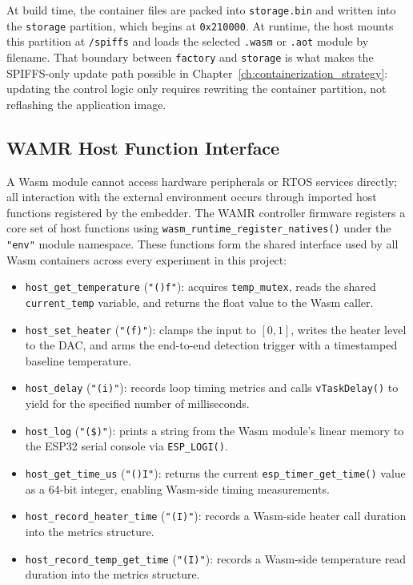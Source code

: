 \documentclass[12pt, a4paper]{report}
\begin{document}
At build time, the container files are packed into \texttt{storage.bin} and written into the \texttt{storage} partition, which begins at \texttt{0x210000}. At runtime, the host mounts this partition at \texttt{/spiffs} and loads the selected \texttt{.wasm} or \texttt{.aot} module by filename. That boundary between \texttt{factory} and \texttt{storage} is what makes the SPIFFS-only update path possible in Chapter~\ref{ch:containerization_strategy}: updating the control logic only requires rewriting the container partition, not reflashing the application image.

\subsection{WAMR Host Function Interface}
\label{subsec:host-functions-design}

A Wasm module cannot access hardware peripherals or RTOS services directly; all interaction with the external environment occurs through imported host functions registered by the embedder. The WAMR controller firmware registers a core set of host functions using \texttt{wasm\_runtime\_register\_natives()} under the \texttt{"env"} module namespace. These functions form the shared interface used by all Wasm containers across every experiment in this project:

\begin{itemize}
    \item \texttt{host\_get\_temperature} (\texttt{"()f"}): acquires \texttt{temp\_mutex}, reads the shared \texttt{current\_temp} variable, and returns the float value to the Wasm caller.
    \item \texttt{host\_set\_heater} (\texttt{"(f)"}): clamps the input to $[0, 1]$, writes the heater level to the DAC, and arms the end-to-end detection trigger with a timestamped baseline temperature.
    \item \texttt{host\_delay} (\texttt{"(i)"}): records loop timing metrics and calls \texttt{vTaskDelay()} to yield for the specified number of milliseconds.
    \item \texttt{host\_log} (\texttt{"(\$)"}): prints a string from the Wasm module's linear memory to the ESP32 serial console via \texttt{ESP\_LOGI()}.
    \item \texttt{host\_get\_time\_us} (\texttt{"()I"}): returns the current \texttt{esp\_timer\_get\_time()} value as a 64-bit integer, enabling Wasm-side timing measurements.
    \item \texttt{host\_record\_heater\_time} (\texttt{"(I)"}): records a Wasm-side heater call duration into the metrics structure.
    \item \texttt{host\_record\_temp\_get\_time} (\texttt{"(I)"}): records a Wasm-side temperature read duration into the metrics structure.
\end{itemize}
\end{document}
